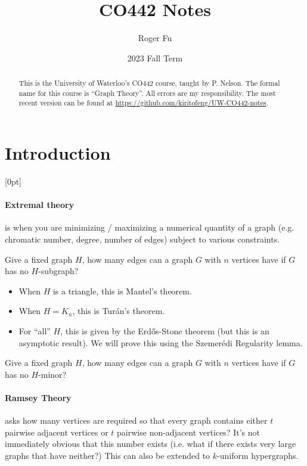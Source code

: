 \documentclass{scrartcl}
\author{Roger Fu}
\date{2023 Fall Term}
\title{CO442 Notes}
\newcommand*{\rmnote}[2][0pt]{\reversemarginpar{}\marginnote{\footnotesize #2}[#1]\normalmarginpar{}}
\newcommand*{\lecture}[1]{\rmnote{\ttfamily #1}}
\begin{document}
\maketitle
\begin{abstract}
  This is the University of Waterloo's CO442 course, taught by P. Nelson.
  The formal name for this course is ``Graph Theory''.
  All errors are my responsibility.
  The most recent version can be found at \url{https://github.com/kiritofeng/UW-CO442-notes}.
\end{abstract}

\tableofcontents
\clearpage
\section{Introduction}\lecture{Thu Sep 07}
\paragraph{Extremal theory} is when you are minimizing / maximizing a numerical
quantity of a graph (e.g. chromatic number, degree, number of edges)
subject to various constraints.

\begin{question*}
  Give a fixed graph $H$, how many edges can a graph $G$ with $n$ vertices have
  if $G$ has no $H$-subgraph?
\end{question*}
\begin{itemize}
  \item When $H$ is a triangle, this is Mantel's theorem.
  \item When $H = K_n$, this is Tur\'an's theorem.
  \item For ``all'' $H$, this is given by the Erd\H{o}s-Stone theorem
    (but this is an asymptotic result).
    We will prove this using the Szemer\'edi Regularity lemma.
\end{itemize}

\begin{question*}
  Give a fixed graph $H$, how many edges can a graph $G$ with $n$ vertices have
  if $G$ has no $H$-minor?
\end{question*}

\paragraph{Ramsey Theory} asks how many vertices are required so that every graph
contains either $t$ pairwise adjacent vertices or $t$ pairwise non-adjacent
vertices?
It's not immediately obvious that this number exists (i.e. what if there exists
very large graphs that have neither?)
This can also be extended to $k$-uniform hypergraphs.
\end{document}
